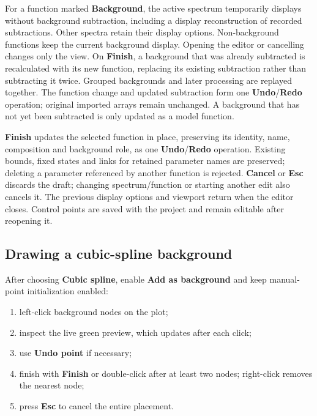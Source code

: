 \documentclass[
  10pt,
  a4paper,
  oneside]{scrreprt}
\providecommand{\tightlist}{%
  \setlength{\itemsep}{0pt}\setlength{\parskip}{0pt}}
\begin{document}
For a function marked \textbf{Background}, the active spectrum
temporarily displays without background subtraction, including a display
reconstruction of recorded subtractions. Other spectra retain their
display options. Non-background functions keep the current background
display. Opening the editor or cancelling changes only the view. On
\textbf{Finish}, a background that was already subtracted is
recalculated with its new function, replacing its existing subtraction
rather than subtracting it twice. Grouped backgrounds and later
processing are replayed together. The function change and updated
subtraction form one \textbf{Undo}/\textbf{Redo} operation; original
imported arrays remain unchanged. A background that has not yet been
subtracted is only updated as a model function.

\textbf{Finish} updates the selected function in place, preserving its
identity, name, composition and background role, as one
\textbf{Undo}/\textbf{Redo} operation. Existing bounds, fixed states and
links for retained parameter names are preserved; deleting a parameter
referenced by another function is rejected. \textbf{Cancel} or
\textbf{Esc} discards the draft; changing spectrum/function or starting
another edit also cancels it. The previous display options and viewport
return when the editor closes. Control points are saved with the project
and remain editable after reopening it.

\hypertarget{drawing-a-cubic-spline-background}{%
\subsection{Drawing a cubic-spline
background}\label{drawing-a-cubic-spline-background}}

After choosing \textbf{Cubic spline}, enable \textbf{Add as background}
and keep manual-point initialization enabled:

\begin{enumerate}
\def\labelenumi{\arabic{enumi}.}
\tightlist
\item
  left-click background nodes on the plot;
\item
  inspect the live green preview, which updates after each click;
\item
  use \textbf{Undo point} if necessary;
\item
  finish with \textbf{Finish} or double-click after at least two nodes;
  right-click removes the nearest node;
\item
  press \textbf{Esc} to cancel the entire placement.
\end{enumerate}
\end{document}
